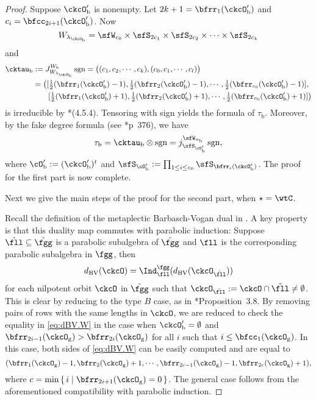 \documentclass[12pt,a4paper]{amsart}
\def\subset{\subseteq}
\newcommand{\sgn}{\operatorname{sgn}}
\numberwithin{equation}{section}
\theoremstyle{remark}
\def\half{{\tfrac{1}{2}}}
\def\dBV{d_{\mathrm{BV}}}
\def\lamckb{\lambda_{\ckcO_{\mathrm b}}}
\def\Wb{W_{\mathrm b}}
\def\ckfgg{{\check \fgg}}
\def\ckcOpb{\ckcO'_{\mathrm b}}
\def\cOpb{\cO'_{\mathrm b}}
\def\ckcOg{\ckcO_{\mathrm g}}
\begin{document}
\begin{proof}
{    Suppose $\ckcOpb$ is nonempty.
    Let $2k+1=\bfrr_{1}(\ckcOpb)$ and $c_{i} = \bfcc_{2i+1}(\ckcOpb)$.
    Now
    \[
      W_{\lamckb} = \sfW_{c_{0}} \times \sfS_{2c_{1}} \times \sfS_{2c_{2}}\times \cdots \times \sfS_{2c_{k}}
    \]
    and %
    \[
      \begin{split}
        \cktau_{\mathrm b} &:= J_{W_{\lamckb}}^{\Wb} \sgn
        = \big((c_{1},c_{2},\cdots, c_{k}),(c_{0},c_{1}, \cdots, c_{l})\big)\\
        & = \big([\half(\bfrr_{1}(\ckcOpb)-1),\half(\bfrr_{2}(\ckcOpb)-1),\cdots, \half(\bfrr_{c_{0}}(\ckcOpb)-1)],\\
        & \hspace{2em} [\half(\bfrr_{1}(\ckcOpb)+1),\half(\bfrr_{2}(\ckcOpb)+1),\cdots, \half(\bfrr_{c_{0}}(\ckcOpb)+1)]\big)
      \end{split}
    \]
    is irreducible by \cite{Lu}*{(4.5.4)}. Tensoring with sign yields the
    formula of $\tau_{\mathrm b}$. Moreover, by the fake degree formula (see
    \cite{Carter}*{p~376}), we have
    \[
      \tau_{\mathrm b} = \cktau_{\mathrm b}\otimes \sgn = j_{\sfS_{\cO'_{\mathrm b}}}^{\sfW_{n_{\mathrm b}}} \sgn,
    \]
    where
    $ \cOpb:= (\ckcOpb)^{t}$
    and $\sfS_{\cOpb} := \prod_{1\leq i\leq c_{0}}\sfS_{\bfrr_{i}(\ckcOpb)}$. The proof for the first part is now complete.

    \medskip \def\ckfll{\check{\fll}}

    Next we give the main steps of the proof for the second part, when $\star = \wtC$.

    Recall the definition of the metaplectic Barbasch-Vogan dual in
    \cite{BMSZ1}. A key property is that this duality map commutes with parabolic induction: Suppose
    $\ckfll\subset \ckfgg$ is a parabolic subalgebra of $\ckfgg$ and
    $\fll$ is the corresponding parabolic subalgebra in $\fgg$, then
    \begin{equation*}%
      \dBV(\ckcO) =  \Ind_{\fll}^{\fgg}(\dBV(\ckcO_{\ckfll}))
    \end{equation*}
    for each nilpotent orbit $\ckcO$ in $\ckfgg$ such that
    $\ckcO_{\ckfll}:=\ckcO\cap \ckfll\neq \emptyset$. This is clear by reducing
    to the type $B$ case, as in \cite{BMSZ1}*{Proposition~3.8}. By removing pairs
    of rows with the same lengths in $\ckcO$, we are reduced to check the equality in \eqref{eq:dBV.W}
    in the case when $\ckcOpb=\emptyset$ and
    $\bfrr_{2i-1}(\ckcO_{\mathrm g})>\bfrr_{2i}(\ckcO_{\mathrm g})$ for all $i$ such that
    $i\leq \bfcc_{1}(\ckcO_{\mathrm g})$. In this case, both sides of \eqref{eq:dBV.W}
    can be easily computed and are equal to
    \[
      (\bfrr_{1}(\ckcOg)-1, \bfrr_{2}(\ckcOg)+1, \cdots,\bfrr_{2c-1}(\ckcOg)-1,\bfrr_{2c}(\ckcOg)+1),
    \]
    where $c = \min\set{i|\bfrr_{2i+1}(\ckcOg)=0}$. The general case follows
    from the aforementioned compatibility with parabolic induction.
    }
  \end{proof}
\end{document}
